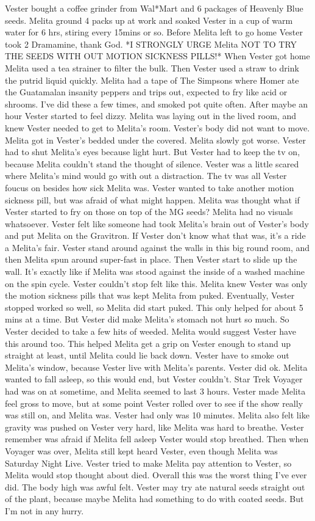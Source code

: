 \documentclass[12pt]{book}
\begin{document}
Vester bought a coffee grinder from Wal*Mart and 6 packages of Heavenly Blue seeds. Melita ground 4 packs up at work and soaked Vester in a cup of warm water for 6 hrs, stiring every 15mins or so. Before Melita left to go home Vester took 2 Dramamine, thank God. *I STRONGLY URGE Melita NOT TO TRY THE SEEDS WITH OUT MOTION SICKNESS PILLS!* When Vester got home Melita used a tea strainer to filter the bulk. Then Vester used a straw to drink the putrid liquid quickly. Melita had a tape of The Simpsons where Homer ate the Guatamalan insanity peppers and trips out, expected to fry like acid or shrooms. I've did these a few times, and smoked pot quite often. After maybe an hour Vester started to feel dizzy. Melita was laying out in the lived room, and knew Vester needed to get to Melita's room. Vester's body did not want to move. Melita got in Vester's bedded under the covered. Melita slowly got worse. Vester had to shut Melita's eyes because light hurt. But Vester had to keep the tv on, because Melita couldn't stand the thought of silence. Vester was a little scared where Melita's mind would go with out a distraction. The tv was all Vester foucus on besides how sick Melita was. Vester wanted to take another motion sickness pill, but was afraid of what might happen. Melita was thought what if Vester started to fry on those on top of the MG seeds? Melita had no visuals whatsoever. Vester felt like someone had took Melita's brain out of Vester's body and put Melita on the Gravitron. If Vester don't know what that was, it's a ride a Melita's fair. Vester stand around against the walls in this big round room, and then Melita spun around super-fast in place. Then Vester start to slide up the wall. It's exactly like if Melita was stood against the inside of a washed machine on the spin cycle. Vester couldn't stop felt like this. Melita knew Vester was only the motion sickness pills that was kept Melita from puked. Eventually, Vester stopped worked so well, so Melita did start puked. This only helped for about 5 mins at a time. But Vester did make Melita's stomach not hurt so much. So Vester decided to take a few hits of weeded. Melita would suggest Vester have this around too. This helped Melita get a grip on Vester enough to stand up straight at least, until Melita could lie back down. Vester have to smoke out Melita's window, because Vester live with Melita's parents. Vester did ok. Melita wanted to fall asleep, so this would end, but Vester couldn't. Star Trek Voyager had was on at sometime, and Melita seemed to last 3 hours. Vester made Melita feel gross to move, but at some point Vester rolled over to see if the show really was still on, and Melita was. Vester had only was 10 minutes. Melita also felt like gravity was pushed on Vester very hard, like Melita was hard to breathe. Vester remember was afraid if Melita fell asleep Vester would stop breathed. Then when Voyager was over, Melita still kept heard Vester, even though Melita was Saturday Night Live. Vester tried to make Melita pay attention to Vester, so Melita would stop thought about died. Overall this was the worst thing I've ever did. The body high was awful felt. Vester may try ate natural seeds straight out of the plant, because maybe Melita had something to do with coated seeds. But I'm not in any hurry.
\end{document}

